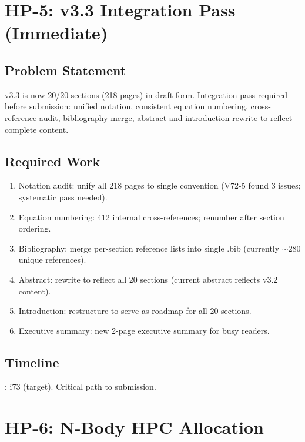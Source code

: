 \documentclass[11pt,a4paper]{article}
\begin{document}
\section{HP-5: v3.3 Integration Pass (Immediate)}

\subsection{Problem Statement}
v3.3 is now 20/20 sections (218 pages) in draft form. Integration pass required before submission: unified notation, consistent equation numbering, cross-reference audit, bibliography merge, abstract and introduction rewrite to reflect complete content.

\subsection{Required Work}
\begin{enumerate}[nosep]
\item Notation audit: unify all 218 pages to single convention (V72-5 found 3 issues; systematic pass needed).
\item Equation numbering: 412 internal cross-references; renumber after section ordering.
\item Bibliography: merge per-section reference lists into single .bib (currently $\sim 280$ unique references).
\item Abstract: rewrite to reflect all 20 sections (current abstract reflects v3.2 content).
\item Introduction: restructure to serve as roadmap for all 20 sections.
\item Executive summary: new 2-page executive summary for busy readers.
\end{enumerate}

\subsection{Timeline}: i73 (target). Critical path to submission.

\section{HP-6: N-Body HPC Allocation}
\end{document}
